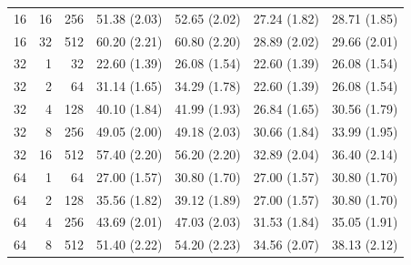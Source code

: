 \documentclass[11pt,letterpaper]{article}
\begin{document}
\begin{table}[p]
\begin{tabular}{@{}rrr rrrr@{}}
16 & 16 & 256 & 51.38 {\scriptsize (2.03)} & 52.65 {\scriptsize (2.02)} & 27.24 {\scriptsize (1.82)} & 28.71 {\scriptsize (1.85)} \\
16 & 32 & 512 & 60.20 {\scriptsize (2.21)} & 60.80 {\scriptsize (2.20)} & 28.89 {\scriptsize (2.02)} & 29.66 {\scriptsize (2.01)} \\
\midrule
32 & 1 & 32 & 22.60 {\scriptsize (1.39)} & 26.08 {\scriptsize (1.54)} & 22.60 {\scriptsize (1.39)} & 26.08 {\scriptsize (1.54)} \\
32 & 2 & 64 & 31.14 {\scriptsize (1.65)} & 34.29 {\scriptsize (1.78)} & 22.60 {\scriptsize (1.39)} & 26.08 {\scriptsize (1.54)} \\
32 & 4 & 128 & 40.10 {\scriptsize (1.84)} & 41.99 {\scriptsize (1.93)} & 26.84 {\scriptsize (1.65)} & 30.56 {\scriptsize (1.79)} \\
32 & 8 & 256 & 49.05 {\scriptsize (2.00)} & 49.18 {\scriptsize (2.03)} & 30.66 {\scriptsize (1.84)} & 33.99 {\scriptsize (1.95)} \\
32 & 16 & 512 & 57.40 {\scriptsize (2.20)} & 56.20 {\scriptsize (2.20)} & 32.89 {\scriptsize (2.04)} & 36.40 {\scriptsize (2.14)} \\
\midrule
64 & 1 & 64 & 27.00 {\scriptsize (1.57)} & 30.80 {\scriptsize (1.70)} & 27.00 {\scriptsize (1.57)} & 30.80 {\scriptsize (1.70)} \\
64 & 2 & 128 & 35.56 {\scriptsize (1.82)} & 39.12 {\scriptsize (1.89)} & 27.00 {\scriptsize (1.57)} & 30.80 {\scriptsize (1.70)} \\
64 & 4 & 256 & 43.69 {\scriptsize (2.01)} & 47.03 {\scriptsize (2.03)} & 31.53 {\scriptsize (1.84)} & 35.05 {\scriptsize (1.91)} \\
64 & 8 & 512 & 51.40 {\scriptsize (2.22)} & 54.20 {\scriptsize (2.23)} & 34.56 {\scriptsize (2.07)} & 38.13 {\scriptsize (2.12)} \\
\bottomrule
\end{tabular}
\end{table}
\end{document}
